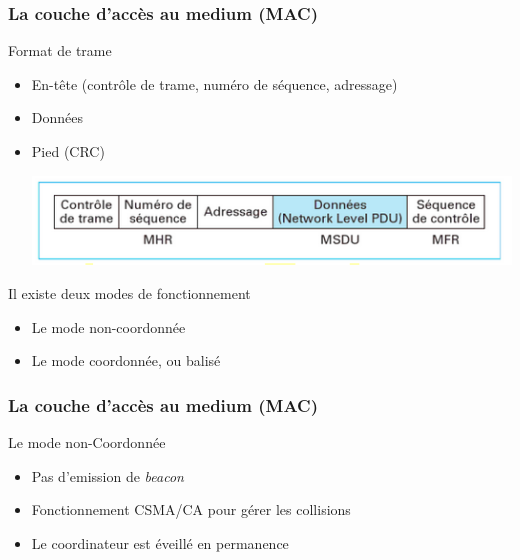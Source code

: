 \documentclass{beamer}
\begin{document}
  \begin{frame}
    \frametitle{La couche d'accès au medium (MAC)}
    \begin{block}{Format de trame}
      \begin{itemize}
        \item En-tête (contrôle de trame, numéro de séquence, adressage)
        \item Données
        \item Pied (CRC)
        \begin{center}
         \includegraphics[scale=0.5]{Couche-MAC.png}
        \end{center} 
      \end{itemize}
    \end{block}
    \begin{block}{Il existe deux modes de fonctionnement}
      \begin{itemize}
        \item Le mode non-coordonnée
        \item Le mode coordonnée, ou balisé
      \end{itemize}
    \end{block}
  \end{frame}
  
  \begin{frame}
    \frametitle{La couche d'accès au medium (MAC)}
    \begin{block}{Le mode non-Coordonnée}
      \begin{itemize}
        \item Pas d'emission de \textit{beacon}
        \item Fonctionnement CSMA/CA pour gérer les collisions
        \item Le coordinateur est éveillé en permanence
      \end{itemize}
    \end{block}
  \end{frame}
\end{document}
